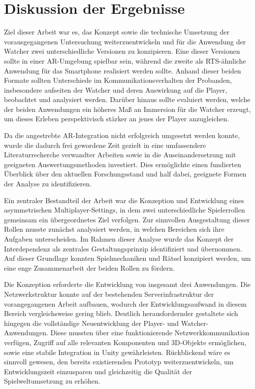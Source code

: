 \chapter{Diskussion der Ergebnisse}\label{sec:discussion}

Ziel dieser Arbeit war es, das Konzept sowie die technische Umsetzung der vorausgegangenen Untersuchung weiterzuentwickeln und für die Anwendung der Watcher zwei unterschiedliche Versionen zu konzipieren. Eine dieser Versionen sollte in einer \ac{AR}-Umgebung spielbar sein, während die zweite als \ac{RTS}-ähnliche Anwendung für das Smartphone realisiert werden sollte. Anhand dieser beiden Formate sollten Unterschiede im Kommunikationsverhalten der Probanden, insbesondere aufseiten der Watcher und deren Auswirkung auf die Player, beobachtet und analysiert werden. Darüber hinaus sollte evaluiert werden, welche der beiden Anwendungen ein höheres Maß an Immersion für die Watcher erzeugt, um dieses Erleben perspektivisch stärker an jenes der Player anzugleichen.

Da die angestrebte \ac{AR}-Integration nicht erfolgreich umgesetzt werden konnte, wurde die dadurch frei gewordene Zeit gezielt in eine umfassendere Literaturrecherche verwandter Arbeiten sowie in die Auseinandersetzung mit geeigneten Auswertungsmethoden investiert. Dies ermöglichte einen fundierten Überblick über den aktuellen Forschungsstand und half dabei, geeignete Formen der Analyse zu identifizieren.

Ein zentraler Bestandteil der Arbeit war die Konzeption und Entwicklung eines asymmetrischen Multiplayer-Settings, in dem zwei unterschiedliche Spielerrollen gemeinsam ein übergeordnetes Ziel verfolgen. Zur sinnvollen Ausgestaltung dieser Rollen musste zunächst analysiert werden, in welchen Bereichen sich ihre Aufgaben unterscheiden. Im Rahmen dieser Analyse wurde das Konzept der Interdependenz als zentrales Gestaltungsprinzip identifiziert und übernommen. Auf dieser Grundlage konnten Spielmechaniken und Rätsel konzipiert werden, um eine enge Zusammenarbeit der beiden Rollen zu fördern.

Die Konzeption erforderte die Entwicklung von insgesamt drei Anwendungen. Die Netzwerkstruktur konnte auf der bestehenden Serverinfrastruktur der vorangegangenen Arbeit aufbauen, wodurch der Entwicklungsaufwand in diesem Bereich vergleichsweise gering blieb. Deutlich herausfordernder gestaltete sich hingegen die vollständige Neuentwicklung der Player- und Watcher-Anwendungen. Diese mussten über eine funktionierende Netzwerkkommunikation verfügen, Zugriff auf alle relevanten Komponenten und \ac{3D}-Objekte ermöglichen, sowie eine stabile Integration in Unity gewährleisten. Rückblickend wäre es sinnvoll gewesen, den bereits existierenden Prototyp weiterzuentwickeln, um Entwicklungszeit einzusparen und gleichzeitig die Qualität der Spielweltumsetzung zu erhöhen.

